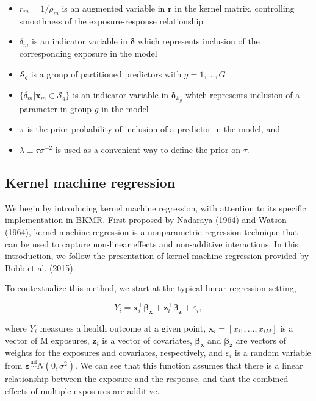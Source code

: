 \documentclass[12pt, twoside]{amherstthesis}
\providecommand{\tightlist}{%
  \setlength{\itemsep}{0pt}\setlength{\parskip}{0pt}}
\begin{document}
\begin{itemize}
\tightlist
\item
  \(r_m=1/\rho_m\) is an augmented variable in \(\textbf{r}\) in the kernel matrix, controlling smoothness of the exposure-response relationship
\item
  \(\delta_m\) is an indicator variable in \(\boldsymbol\delta\) which represents inclusion of the corresponding exposure in the model
\item
  \(\mathcal{S}_g\) is a group of partitioned predictors with \({g=1,\dots,G}\)
\item
  \(\{\delta_m|\textbf{x}_m \in{\mathcal{S}_g}\}\) is an indicator variable in \(\boldsymbol\delta_{\mathcal{S}_g}\) which represents inclusion of a parameter in group \(g\) in the model
\item
  \(\pi\) is the prior probability of inclusion of a predictor in the model, and
\item
  \(\lambda \equiv \tau\sigma^{-2}\) is used as a convenient way to define the prior on \(\tau\).
\end{itemize}
\hypertarget{kernel-machine-regression}{%
\subsection{Kernel machine regression}\label{kernel-machine-regression}}

We begin by introducing kernel machine regression, with attention to its specific implementation in BKMR. First proposed by Nadaraya (\protect\hyperlink{ref-nadaraya_estimating_1964}{1964}) and Watson (\protect\hyperlink{ref-watson_smooth_1964}{1964}), kernel machine regression is a nonparametric regression technique that can be used to capture non-linear effects and non-additive interactions. In this introduction, we follow the presentation of kernel machine regression provided by Bobb et al. (\protect\hyperlink{ref-bobb_bayesian_2015}{2015}).

To contextualize this method, we start at the typical linear regression setting,

\[
Y_i = \textbf{x}_i^\top \boldsymbol{\beta}_{\textbf{x}} + \textbf{z}_i^\top \boldsymbol{\beta}_{\textbf{z}} + \varepsilon_i,
\]

\noindent where \(Y_i\) measures a health outcome at a given point, \(\textbf{x}_i = [x_{i1},\dots,x_{iM}]\) is a vector of M exposures, \(\textbf{z}_i\) is a vector of covariates, \(\boldsymbol{\beta}_{\textbf{x}}\) and \(\boldsymbol{\beta}_{\textbf{z}}\) are vectors of weights for the exposures and covariates, respectively, and \(\varepsilon_i\) is a random variable from \(\boldsymbol\varepsilon \overset{\mathrm{iid}}{\sim} N(0, \sigma^2)\). We can see that this function assumes that there is a linear relationship between the exposure and the response, and that the combined effects of multiple exposures are additive.
\end{document}
